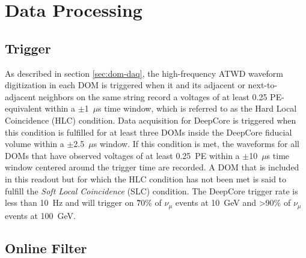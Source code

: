 \section{Data Processing}
\label{sec:data-processing}

\subsection{Trigger}
As described in section \ref{sec:dom-daq}, the high-frequency ATWD waveform digitization in each DOM is triggered when it and its adjacent or next-to-adjacent neighbors on the same string record a voltages of at least 0.25 PE-equivalent within a $\pm$1~$\mu$s time window, which is referred to as the Hard Local Coincidence (HLC) condition. Data acquisition for DeepCore is triggered when this condition is fulfilled for at least three DOMs inside the DeepCore fiducial volume within a $\pm$2.5~$\mu$s window. If this condition is met, the waveforms for all DOMs that have observed voltages of at least 0.25~PE within a $\pm$10~$\mu$s time window centered around the trigger time are recorded. A DOM that is included in this readout but for which the HLC condition has not been met is said to fulfill the \emph{Soft Local Coincidence} (SLC) condition. The DeepCore trigger rate is less than 10~Hz and will trigger on \~70\% of $\nu_\mu$ events at 10~GeV and >90\% of $\nu_\mu$ events at 100~GeV\cite{DeepCore}.

\subsection{Online Filter}


